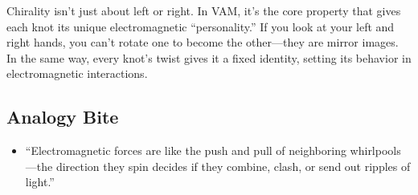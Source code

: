 Chirality isn’t just about left or right. In VAM, it’s the core property that gives each knot its unique electromagnetic “personality.” If you look at your left and right hands, you can’t rotate one to become the other—they are mirror images. In the same way, every knot’s twist gives it a fixed identity, setting its behavior in electromagnetic interactions.


\subsection*{Analogy Bite}

\begin{itemize}

\item
“Electromagnetic forces are like the push and pull of neighboring whirlpools—the direction they spin decides if they combine, clash, or send out ripples of light.”




\end{itemize}